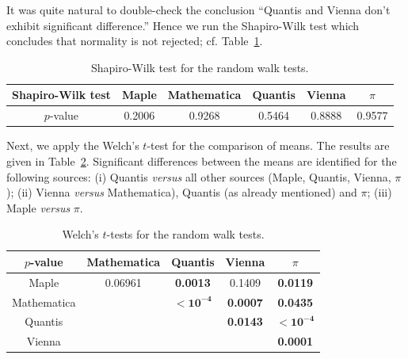 \documentclass[10pt]{article}%
\begin{document}
It was quite natural to double-check the conclusion  ``Quantis and Vienna don't
exhibit significant difference.'' Hence we run the Shapiro-Wilk test which concludes
that normality is not rejected; cf. Table~\ref{tab:14}.


\begin{table}
\caption{Shapiro-Wilk test for the random walk tests.}\label{tab:14}
\begin{center}
\begin{tabular}
[c]{ c c c c c c }\hline\hline
Shapiro-Wilk test & Maple & Mathematica & Quantis & Vienna  & $\pi$\\\hline
$p$-value & 0.2006 & 0.9268 & 0.5464 & 0.8888 &
0.9577\\\hline\hline
\end{tabular}
\end{center}
\end{table}

Next, we apply the Welch's $t$-test for the comparison of means. The
results are given in Table~\ref{tab:15}.
Significant differences between the means are identified for the
following sources:
(i) Quantis {\it versus} all other sources (Maple, Quantis, Vienna, $\pi$);
(ii)
Vienna {\it versus} Mathematica), Quantis (as already mentioned) and $\pi$;
(iii) Maple {\it versus} $\pi$.

\begin{table}
\caption{Welch's $t$-tests for the random walk tests.}\label{tab:15}
\begin{center}
\begin{tabular}
[c]{ c c c c c }\hline\hline
$p$-value & Mathematica & Quantis & Vienna & $\pi$\\\hline
Maple & 0.06961 & \bf{0.0013} & 0.1409 & \bf{0.0119}\\
Mathematica &  & $\mathbf{< 10^{-4}}$ & \bf{0.0007} & \bf{0.0435}\\
Quantis &  &  & \bf{0.0143} & $\mathbf{< 10^{-4}}$\\
Vienna &  &  &  & \bf{0.0001}\\\hline\hline
\end{tabular}
\end{center}
\end{table}


\end{document}

